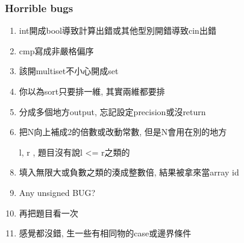 \subsubsection{Horrible bugs}
\begin{enumerate}\itemsep = -3pt
	\item int開成bool導致計算出錯或其他型別開錯導致cin出錯
	\item cmp寫成非嚴格偏序
	\item 該開multiset不小心開成set
	\item 你以為sort只要排一維, 其實兩維都要排
	\item 分成多個地方output, 忘記設定precision或沒return
	\item 把N向上補成2的倍數或改動常數, 但是N會用在別的地方
	\item [l, r], 題目沒有說l <= r之類的
	\item 填入無限大或負數之類的湊成整數倍, 結果被拿來當array id
	\item Any unsigned BUG?
	\item 再把題目看一次
	\item 感覺都沒錯, 生一些有相同物的case或邊界條件
\end{enumerate}

%